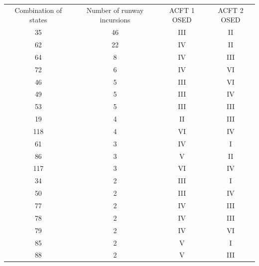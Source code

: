 \begin{table}[H]
\begin{tabular}{cccc}
Combination of   states & Number of runway incursions & ACFT 1 OSED & ACFT 2 OSED \\
35                      & 46                          & III         & II          \\
62                      & 22                          & IV          & II          \\
64                      & 8                           & IV          & III         \\
72                      & 6                           & IV          & VI          \\
46                      & 5                           & III         & VI          \\
49                      & 5                           & III         & IV          \\
53                      & 5                           & III         & III         \\
19                      & 4                           & II          & III         \\
118                     & 4                           & VI          & IV          \\
61                      & 3                           & IV          & I           \\
86                      & 3                           & V           & II          \\
117                     & 3                           & VI          & IV          \\
34                      & 2                           & III         & I           \\
50                      & 2                           & III         & IV          \\
77                      & 2                           & IV          & III         \\
78                      & 2                           & IV          & III         \\
79                      & 2                           & IV          & VI          \\
85                      & 2                           & V           & I           \\
88                      & 2                           & V           & III         \\

\end{tabular}
\end{table}
